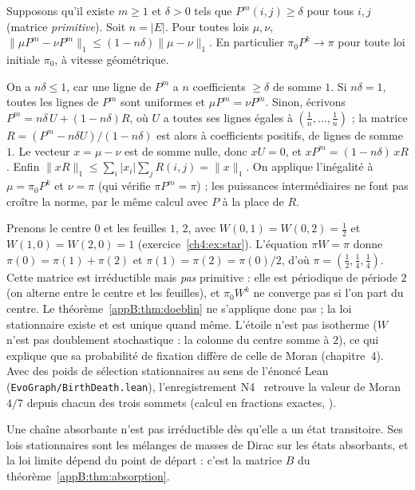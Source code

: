 \begin{theorem}\label{appB:thm:doeblin}
Supposons qu'il existe $m\ge1$ et $\delta>0$ tels que $P^m(i,j)\ge\delta$ pour tous $i,j$ (matrice \emph{primitive}). Soit
$n=|E|$. Pour toutes lois $\mu,\nu$, $\|\mu P^m-\nu P^m\|_1\le(1-n\delta)\|\mu-\nu\|_1$. En particulier $\pi_0P^k\to\pi$
pour toute loi initiale $\pi_0$, à vitesse géométrique.
\end{theorem}

\begin{humanproof}
On a $n\delta\le1$, car une ligne de $P^m$ a $n$ coefficients $\ge\delta$ de somme $1$. Si $n\delta=1$, toutes les lignes
de $P^m$ sont uniformes et $\mu P^m=\nu P^m$. Sinon, écrivons $P^m=n\delta\,U+(1-n\delta)R$, où $U$ a toutes ses
lignes égales à $(\frac1n,\dots,\frac1n)$ ; la matrice $R=(P^m-n\delta U)/(1-n\delta)$ est alors à coefficients
positifs, de lignes de somme $1$. Le vecteur $x=\mu-\nu$ est de somme nulle, donc $xU=0$, et
$xP^m=(1-n\delta)\,xR$. Enfin $\|xR\|_1\le\sum_i|x_i|\sum_jR(i,j)=\|x\|_1$. On applique l'inégalité à $\mu=\pi_0P^k$ et
$\nu=\pi$ (qui vérifie $\pi P^m=\pi$) ; les puissances intermédiaires ne font pas croître la norme, par le même calcul
avec $P$ à la place de $R$.
\end{humanproof}

\begin{example}\label{appB:ex:etoile}
Prenons le centre $0$ et les feuilles $1$, $2$, avec $W(0,1)=W(0,2)=\frac12$ et $W(1,0)=W(2,0)=1$ (exercice~\ref{ch4:ex:star}).
L'équation $\pi W=\pi$ donne $\pi(0)=\pi(1)+\pi(2)$ et $\pi(1)=\pi(2)=\pi(0)/2$, d'où $\pi=(\frac12,\frac14,\frac14)$.
Cette matrice est irréductible mais \emph{pas} primitive : elle est périodique de période $2$ (on alterne entre le
centre et les feuilles), et $\pi_0W^k$ ne converge pas si l'on part du centre. Le théorème~\ref{appB:thm:doeblin} ne
s'applique donc pas ; la loi stationnaire existe et est unique quand même. L'étoile n'est pas isotherme ($W$ n'est pas
doublement stochastique : la colonne du centre somme à $2$), ce qui explique que sa probabilité de fixation diffère de
celle de Moran (chapitre~4). Avec des poids de sélection stationnaires au sens de l'énoncé Lean 
(\texttt{EvoGraph/BirthDeath.lean}), l'enregistrement N4~\cite{ch4:N4} retrouve la valeur de Moran $4/7$ depuis chacun
des trois sommets (calcul en fractions exactes, \tierX).
\end{example}

\begin{remark}
Une chaîne absorbante n'est pas irréductible dès qu'elle a un état transitoire. Ses lois stationnaires sont les
mélanges de masses de Dirac sur les états absorbants, et la loi limite dépend du point de départ : c'est la matrice
$B$ du théorème~\ref{appB:thm:absorption}.
\end{remark}

